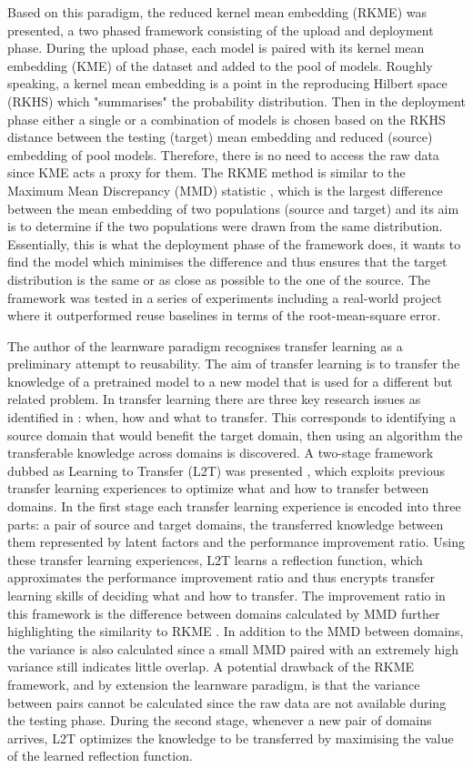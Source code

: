 \documentclass{mprop}
\begin{document}
Based on this paradigm, the reduced kernel mean embedding (RKME) \cite{KernelMMD} was presented, a two phased framework consisting of the upload and deployment phase. During the upload phase, each model is paired with its kernel mean embedding (KME) of the dataset and added to the pool of models. Roughly speaking, a kernel mean embedding is a point in the reproducing Hilbert space (RKHS) which "summarises" the probability distribution. Then in the deployment phase either a single or a combination of models is chosen based on the RKHS distance between the testing (target) mean embedding and reduced (source) embedding of pool models. Therefore, there is no need to access the raw data since KME acts a proxy for them. The RKME method is similar to the Maximum Mean Discrepancy (MMD)  statistic \cite{OriginalMMD}, which is the largest difference between the mean embedding of two populations (source and target) and its aim is to determine if the two populations were drawn from the same distribution. Essentially, this is what the deployment phase of the framework does, it wants to find the model which minimises the difference and thus ensures that the target distribution is the same or as close as possible to the one of the source. The framework was tested in a series of experiments including a real-world project where it outperformed reuse baselines in terms of the root-mean-square error.

The author of the learnware paradigm \cite{Learnware} recognises transfer learning as a preliminary attempt to reusability. The aim of transfer learning is to transfer the knowledge of a pretrained model to a new model that is used for a different but related problem. In transfer learning there are three key research issues as identified in \cite{DefinitionTL}: when, how and what to transfer. This corresponds to identifying a source domain that would benefit the target domain, then using an algorithm the transferable knowledge across domains is discovered. A two-stage framework dubbed as Learning to Transfer (L2T) was presented \cite{L2T}, which exploits previous transfer learning experiences to optimize what and how to transfer between domains. In the first stage each transfer learning experience is encoded into three parts: a pair of source and target domains, the transferred knowledge between them represented by latent factors and the performance improvement ratio. Using these transfer learning experiences, L2T learns a reflection function, which approximates the performance improvement ratio and thus encrypts transfer learning skills of deciding what and how to transfer. The improvement ratio in this framework is the difference between domains calculated by MMD further highlighting the similarity to RKME \cite{KernelMMD}. In addition to the MMD between domains, the variance is also calculated since a small MMD paired with an extremely high variance still indicates little overlap. A potential drawback of the RKME \cite{KernelMMD} framework, and by extension the learnware paradigm, is that the variance between pairs cannot be calculated since the raw data are not available during the testing phase. During the second stage, whenever a new pair of domains arrives, L2T optimizes the knowledge to be transferred by maximising the value of the learned reflection function.
\end{document}
